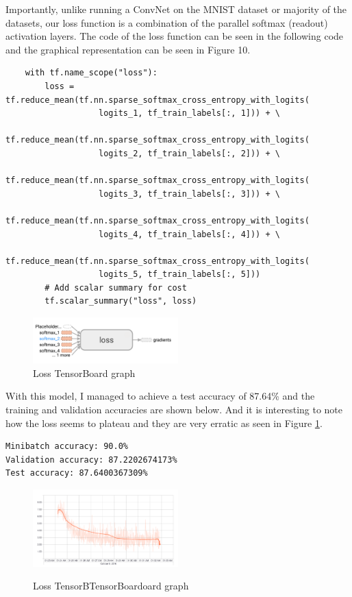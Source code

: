 \documentclass[twoside, column]{article}
\begin{document}
Importantly, unlike running a ConvNet on the MNIST dataset or majority of the datasets, our loss function is a combination of the parallel softmax (readout) activation layers. The code of the loss function can be seen in the following code and the graphical representation can be seen in Figure 10.
\begin{verbatim}
    with tf.name_scope("loss"):
        loss = tf.reduce_mean(tf.nn.sparse_softmax_cross_entropy_with_logits(
                   logits_1, tf_train_labels[:, 1])) + \
               tf.reduce_mean(tf.nn.sparse_softmax_cross_entropy_with_logits(
                   logits_2, tf_train_labels[:, 2])) + \
               tf.reduce_mean(tf.nn.sparse_softmax_cross_entropy_with_logits(
                   logits_3, tf_train_labels[:, 3])) + \
               tf.reduce_mean(tf.nn.sparse_softmax_cross_entropy_with_logits(
                   logits_4, tf_train_labels[:, 4])) + \
               tf.reduce_mean(tf.nn.sparse_softmax_cross_entropy_with_logits(
                   logits_5, tf_train_labels[:, 5]))
        # Add scalar summary for cost
        tf.scalar_summary("loss", loss)
 \end{verbatim}
 
\begin{figure}
\caption{Loss TensorBoard graph}
\centering
\includegraphics[width=0.5\textwidth]{loss_trial_2}
\end{figure}

With this model, I managed to achieve a test accuracy of 87.64\% and the training and validation accuracies are shown below. And it is interesting to note how the loss seems to plateau and they are very erratic as seen in Figure \ref{trial1loss}. 
\definecolor{bg}{rgb}{0.95,0.95,0.95}
\begin{verbatim}
Minibatch accuracy: 90.0%
Validation accuracy: 87.2202674173%
Test accuracy: 87.6400367309%
 \end{verbatim}

\begin{figure}
\caption{Loss TensorBTensorBoardoard graph}
\centering
\includegraphics[width=0.5\textwidth]{loss_trial_1}
\label{trial1loss}
\end{figure}
\end{document}
